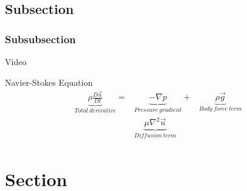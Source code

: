 \documentclass{beamer}
\begin{document}
\subsection{Subsection}
\subsubsection{Subsubsection}

\begin{frame}{Video}
\begin{figure}[ht]
	\vspace{-1cm}
	\hspace*{-2.0cm}
\end{figure}
\end{frame}


\begin{frame}{Navier-Stokes Equation}
\begin{equation*}
\begin{aligned}
\underbrace{\rho\frac{D\vec{u}}{Dt}}_{Total\ derivative} = & \underbrace{-\nabla p}_{Pressure\ gradient} + 
& \underbrace{\rho \vec{g}}_{Body\ force\ term} \\
& \underbrace{\mu\nabla^2\vec{u}}_{Diffusion\ term}\\
\label{eq:eke_de}
\end{aligned}
\end{equation*}
\end{frame}

\section{Section}
\end{document}
